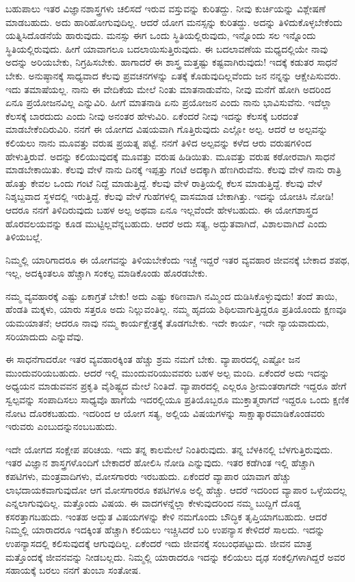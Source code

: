 ಬಹುಪಾಲು ಇತರ ವಿಜ್ಞಾನಶಾಸ್ತ್ರಗಳು ಚಲಿಸದೆ ಇರುವ ವಸ್ತುವನ್ನು ಕುರಿತದ್ದು. ನೀವು ಕುರ್ಚಿಯನ್ನು ವಿಶ್ಲೇಷಣೆ ಮಾಡಬಹುದು. ಅದು ಹಾರಿಹೋಗುವುದಿಲ್ಲ. ಆದರೆ ಯೋಗ ಮನಸ್ಸನ್ನು ಕುರಿತದ್ದು. ಅದನ್ನು ತಿಳಿದುಕೊಳ್ಳಬೇಕೆಂದು ಯತ್ನಿಸಿದೊಡನೆಯೆ ಹಾರುವುದು. ಮನಸ್ಸು ಈಗ ಒಂದು ಸ್ಥಿತಿಯಲ್ಲಿರುವುದು, ಇನ್ನೊಂದು ಸಲ ಇನ್ನೊಂದು ಸ್ಥಿತಿಯಲ್ಲಿರುವುದು. ಹೀಗೆ ಯಾವಾಗಲೂ ಬದಲಾಯಿಸುತ್ತಿರುವುದು. ಈ ಬದಲಾವಣೆಯ ಮಧ್ಯದಲ್ಲಿಯೇ ನಾವು ಅದನ್ನು ಅರಿಯಬೇಕು, ನಿಗ್ರಹಿಸಬೇಕು. ಹಾಗಾದರೆ ಈ ಶಾಸ್ತ್ರ ಮತ್ತಷ್ಟು ಕಷ್ಟವಾಗಿರುವುದು! ಇದಕ್ಕೆ ಕಡುತರ ಸಾಧನೆ ಬೇಕು. ಅನುಷ್ಠಾನಕ್ಕೆ ಸಾಧ್ಯವಾದ ಕೆಲವು ಪ್ರವಚನಗಳನ್ನು ಏತಕ್ಕೆ ಕೊಡುವುದಿಲ್ಲವೆಂದು ಜನ ನನ್ನನ್ನು ಆಕ್ಷೇಪಿಸುವರು. ಇದು ತಮಾಷೆಯಲ್ಲ. ನಾನು ಈ ವೇದಿಕೆಯ ಮೇಲೆ ನಿಂತು ಮಾತನಾಡುವೆನು, ನೀವು ಮನೆಗೆ ಹೋಗಿ ಅದರಿಂದ ಏನೂ ಪ್ರಯೋಜನವಿಲ್ಲ ಎನ್ನುವಿರಿ. ಹೀಗೆ ಮಾತನಾಡಿ ಏನು ಪ್ರಯೋಜನ ಎಂದು ನಾನು ಭಾವಿಸುವೆನು. ಇದೆಲ್ಲಾ ಕೆಲಸಕ್ಕೆ ಬಾರದುದು ಎಂದು ನೀವು ಅನಂತರ ಹೇಳುವಿರಿ. ಏಕೆಂದರೆ ನೀವು ಇದನ್ನು ಕೆಲಸಕ್ಕೆ ಬರದಂತೆ ಮಾಡಬೇಕೆಂದಿರುವಿರಿ. ನನಗೆ ಈ ಯೋಗದ ವಿಷಯವಾಗಿ ಗೊತ್ತಿರುವುದು ಎಲ್ಲೋ ಅಲ್ಪ. ಆದರೆ ಆ ಅಲ್ಪವನ್ನು ಕಲಿಯಲು ನಾನು ಮೂವತ್ತು ವರುಷ ಪ್ರಯತ್ನ ಪಟ್ಟೆ. ನನಗೆ ತಿಳಿದ ಅಲ್ಪವನ್ನು ಕಳೆದ ಆರು ವರುಷಗಳಿಂದ ಹೇಳುತ್ತಿರುವೆ. ಅದನ್ನು ಕಲಿಯುವುದಕ್ಕೆ ಮೂವತ್ತು ವರುಷ ಹಿಡಿಯಿತು. ಮೂವತ್ತು ವರುಷ ಕಠೋರವಾಗಿ ಸಾಧನೆ ಮಾಡಬೇಕಾಯಿತು. ಕೆಲವು ವೇಳೆ ನಾನು ದಿನಕ್ಕೆ ಇಪ್ಪತ್ತು ಗಂಟೆ ಅದಕ್ಕಾಗಿ ಹೆಣಗಿರುವೆನು. ಕೆಲವು ವೇಳೆ ನಾನು ರಾತ್ರಿ ಹೊತ್ತು ಕೇವಲ ಒಂದು ಗಂಟೆ ನಿದ್ದೆ ಮಾಡುತ್ತಿದ್ದೆ. ಕೆಲವು ವೇಳೆ ರಾತ್ರಿಯಲ್ಲಿ ಕೆಲಸ ಮಾಡುತ್ತಿದ್ದೆ. ಕೆಲವು ವೇಳೆ ನಿಶ್ಶಬ್ದವಾದ ಸ್ಥಳದಲ್ಲಿ ಇರುತ್ತಿದ್ದೆ. ಕೆಲವು ವೇಳೆ ಗುಹೆಗಳಲ್ಲಿ ವಾಸಮಾಡ ಬೇಕಾಗಿತ್ತು. ಇದನ್ನು ಯೋಚಿಸಿ ನೋಡಿ! ಆದರೂ ನನಗೆ ತಿಳಿದಿರುವುದು ಬಹಳ ಅಲ್ಪ ಅಥವಾ ಏನೂ ಇಲ್ಲವೆಂದೇ ಹೇಳಬಹುದು. ಈ ಯೋಗಶಾಸ್ತ್ರದ ಹೊರವಲಯವನ್ನು ಕೂಡ ಮುಟ್ಟಿಲ್ಲವೆನ್ನಬಹುದು. ಆದರೆ ಅದು ಸತ್ಯ, ಅದ್ಭುತವಾಗಿದೆ, ವಿಶಾಲವಾಗಿದೆ ಎಂದು ತಿಳಿಯಬಲ್ಲೆ.

ನಿಮ್ಮಲ್ಲಿ ಯಾರಿಗಾದರೂ ಈ ಯೋಗವನ್ನು ತಿಳಿಯಬೇಕೆಂದು ಇಚ್ಚೆ ಇದ್ದರೆ ಇತರ ವ್ಯವಹಾರ ಜೀವನಕ್ಕೆ ಬೇಕಾದ ಶಪಥ, ಇಲ್ಲ, ಅದಕ್ಕಿಂತಲೂ ಹೆಚ್ಚಾಗಿ ಸಂಕಲ್ಪ ಮಾಡಿಕೊಂಡು ಹೊರಡಬೇಕು.

ನಮ್ಮ ವ್ಯವಹಾರಕ್ಕೆ ಎಷ್ಟು ಏಕಾಗ್ರತೆ ಬೇಕು! ಅದು ಎಷ್ಟು ಕಠಿಣವಾಗಿ ನಮ್ಮಿಂದ ದುಡಿಸಿಕೊಳ್ಳುವುದು! ತಂದೆ ತಾಯಿ, ಹೆಂಡತಿ ಮಕ್ಕಳು, ಯಾರು ಸತ್ತರೂ ಅದು ನಿಲ್ಲುವಂತಿಲ್ಲ. ನಮ್ಮ ಹೃದಯ ಶಿಥಿಲವಾಗುತ್ತಿದ್ದರೂ ಪ್ರತಿಯೊಂದು ಕ್ಷಣವೂ ಯಮಯಾತನೆ; ಆದರೂ ನಾವು ನಮ್ಮ ಕಾರ್ಯಕ್ಷೇತ್ರಕ್ಕೆ ತೊಡಗಬೇಕು. ಇದೇ ಕಾರ್ಯ, ಇದೇ ನ್ಯಾಯವಾದುದು, ಸರಿಯಾದುದು ಎನ್ನುವೆವು.

ಈ ಸಾಧನೆಗಾದರೋ ಇತರ ವ್ಯವಹಾರಕ್ಕಿಂತ ಹೆಚ್ಚು ಶ್ರಮ ನಮಗೆ ಬೇಕು. ವ್ಯಾಪಾರದಲ್ಲಿ ಎಷ್ಟೋ ಜನ ಮುಂದುವರಿಯಬಹುದು. ಆದರೆ ಇಲ್ಲಿ ಮುಂದುವರಿಯುವವರು ಬಹಳ ಅಲ್ಪ ಮಂದಿ. ಏಕೆಂದರೆ ಅದು ಇದನ್ನು ಅಧ್ಯಯನ ಮಾಡುವವನ ಪ್ರಕೃತಿ ವೈಶಿಷ್ಟ್ಯದ ಮೇಲೆ ನಿಂತಿದೆ. ವ್ಯಾಪಾರದಲ್ಲಿ ಎಲ್ಲರೂ ಶ‍್ರೀಮಂತರಾಗದೇ ಇದ್ದರೂ ಹೇಗೆ ಸ್ವಲ್ಪವನ್ನು ಸಂಪಾದಿಸಲು ಸಾಧ್ಯವೊ ಹಾಗೆಯೆ ಇದರಲ್ಲಿಯೂ ಪ್ರತಿಯೊಬ್ಬರೂ ಮುಕ್ತಾತ್ಮರಾಗದೆ ಇದ್ದರೂ ಒಂದು ಕ್ಷಣಿಕ ನೋಟ ದೊರಕಬಹುದು. ಇದರಿಂದ ಆ ಯೋಗ ಸತ್ಯ, ಅಲ್ಲಿಯ ವಿಷಯಗಳನ್ನು ಸಾಕ್ಷಾತ್ಕಾರಮಾಡಿಕೊಂಡವರು ಇರುವರು ಎಂಬುದನ್ನು\break ನಂಬಬಹುದು.

ಇದೇ ಯೋಗದ ಸಂಕ್ಷೇಪ ಪರಿಚಯ. ಇದು ತನ್ನ ಕಾಲಮೇಲೆ ನಿಂತಿರುವುದು. ತನ್ನ ಬೆಳಕಿನಲ್ಲಿ ಬೆಳಗುತ್ತಿರುವುದು. ಇತರ ವಿಜ್ಞಾನ ಶಾಸ್ತ್ರಗಳೊಂದಿಗೆ ಬೇಕಾದರೆ ಹೋಲಿಸಿ ನೋಡಿ ಎನ್ನುವುದು. ಇತರ ಕಡೆಗಿಂತ ಇಲ್ಲಿ ಹೆಚ್ಚಾಗಿ ಕಪಟಿಗಳು, ಮಂತ್ರವಾದಿಗಳು, ಮೋಸಗಾರರು ಇರಬಹುದು. ಏಕೆಂದರೆ ವ್ಯಾಪಾರ ಯಾವಾಗ ಹೆಚ್ಚು ಲಾಭದಾಯಕವಾಗುವುದೋ ಆಗ ಮೋಸಗಾರರೂ ಕಪಟಿಗಳೂ ಅಲ್ಲಿ ಹೆಚ್ಚು. ಆದರೆ ಇದರಿಂದ ವ್ಯಾಪಾರ ಒಳ್ಳೆಯದಲ್ಲ ಎನ್ನಲಾಗುವುದಿಲ್ಲ. ಮತ್ತೊಂದು ವಿಷಯ. ಈ ವಾದಗಳನ್ನೆಲ್ಲಾ ಕೇಳುವುದರಿಂದ ನಮ್ಮ ಬುದ್ದಿಗೆ ದೊಡ್ಡ ಕಸರತ್ತಾಗಬಹುದು. ಇಂತಹ ಅದ್ಭುತ ವಿಷಯಗಳನ್ನು ಕೇಳಿ ನಮಗೊಂದು ಬೌದ್ಧಿಕ ತೃಪ್ತಿಯಾಗಬಹುದು. ಆದರೆ ನಿಮ್ಮಲ್ಲಿ ಯಾರಾದರೂ ಇದಕ್ಕಿಂತ ಹೆಚ್ಚಾಗಿ ಕಲಿಯಲು ಇಚ್ಚಿಸಿದರೆ ಬರಿ ಉಪನ್ಯಾಸ ಕೇಳಿದರೆ ಸಾಲದು. ಇದನ್ನು ಉಪನ್ಯಾಸದಲ್ಲಿ ಕಲಿಸುವುದಕ್ಕೆ ಆಗುವುದಿಲ್ಲ. ಏಕೆಂದರೆ ಇದು ಜೀವನಕ್ಕೆ ಸಂಬಂಧಪಟ್ಟುದು. ಜೀವನ ಮಾತ್ರ ಮತ್ತೊಂದಕ್ಕೆ ಜೀವನವನ್ನು ನೀಡಬಲ್ಲದು. ನಿಮ್ಮಲ್ಲಿ ಯಾರಾದರೂ ಇದನ್ನು ಕಲಿಯಲು ದೃಢ ಸಂಕಲ್ಪಿಗಳಾಗಿದ್ದರೆ ಅವರ ಸಹಾಯಕ್ಕೆ ಬರಲು ನನಗೆ ತುಂಬಾ ಸಂತೋಷ.

